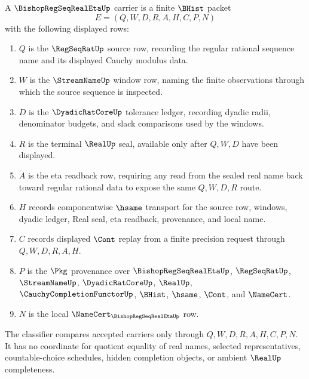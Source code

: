 \begin{definition}
\label{def:bishop-regseq-real-eta-carrier}
A $\BishopRegSeqRealEtaUp$ carrier is a finite $\BHist$ packet
$$
E=(Q,W,D,R,A,H,C,P,N)
$$
with the following displayed rows:
\begin{enumerate}
\item $Q$ is the $\RegSeqRatUp$ source row, recording the regular rational sequence name and its displayed Cauchy modulus data.
\item $W$ is the $\StreamNameUp$ window row, naming the finite observations through which the source sequence is inspected.
\item $D$ is the $\DyadicRatCoreUp$ tolerance ledger, recording dyadic radii, denominator budgets, and slack comparisons used by the windows.
\item $R$ is the terminal $\RealUp$ seal, available only after $Q,W,D$ have been displayed.
\item $A$ is the eta readback row, requiring any read from the sealed real name back toward regular rational data to expose the same $Q,W,D,R$ route.
\item $H$ records componentwise $\hsame$ transport for the source row, windows, dyadic ledger, Real seal, eta readback, provenance, and local name.
\item $C$ records displayed $\Cont$ replay from a finite precision request through $Q,W,D,R,A,H$.
\item $P$ is the $\Pkg$ provenance over $\BishopRegSeqRealEtaUp$, $\RegSeqRatUp$, $\StreamNameUp$, $\DyadicRatCoreUp$, $\RealUp$, $\CauchyCompletionFunctorUp$, $\BHist$, $\hsame$, $\Cont$, and $\NameCert$.
\item $N$ is the local $\NameCert_{\BishopRegSeqRealEtaUp}$ row.
\end{enumerate}
The classifier compares accepted carriers only through $Q,W,D,R,A,H,C,P,N$. It has no coordinate for quotient equality of real names, selected representatives, countable-choice schedules, hidden completion objects, or ambient $\RealUp$ completeness.
\end{definition}

